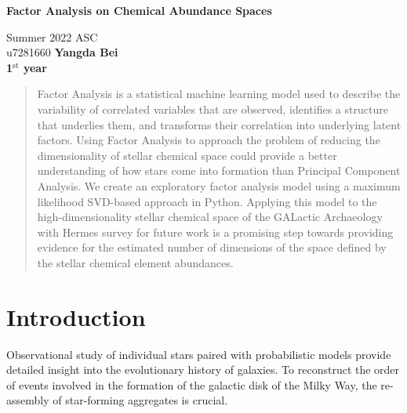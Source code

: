 \documentclass[12pt, letterpaper]{article}
\begin{document}
\begin{titlepage}
   \begin{center}
       \vspace*{1cm}

       \textbf{Factor Analysis on Chemical Abundance Spaces}

       \vspace{0.5cm}
        Summer 2022 ASC \\
        u7281660
       \vspace{1.5cm}
       \textbf{Yangda Bei \\
       1$^{\text{st}}$ year}
       \vfill
       \vspace{0.8cm}
   \end{center}
\end{titlepage}

\begin{abstract}
    Factor Analysis is a statistical machine learning model used to describe the variability of correlated variables that are observed, identifies a structure that underlies them, and transforms their correlation into underlying latent factors. 
    Using Factor Analysis to approach the problem of reducing the dimensionality of stellar chemical space could provide a better understanding of how stars come into formation than Principal Component Analysis. We create an exploratory factor analysis model using a maximum likelihood SVD-based approach in Python. Applying this model to the high-dimensionality stellar chemical space of the GALactic Archaeology with Hermes survey for future work is a promising step towards providing evidence for the estimated number of dimensions of the space defined by the stellar chemical element abundances.
\end{abstract}

\pagebreak

\tableofcontents

\pagebreak

\section{Introduction}

Observational study of individual stars paired with probabilistic models provide detailed insight into the evolutionary history of galaxies. To reconstruct the order of events involved in the formation of the galactic disk of the Milky Way, the re-assembly of star-forming aggregates is crucial.
\end{document}
